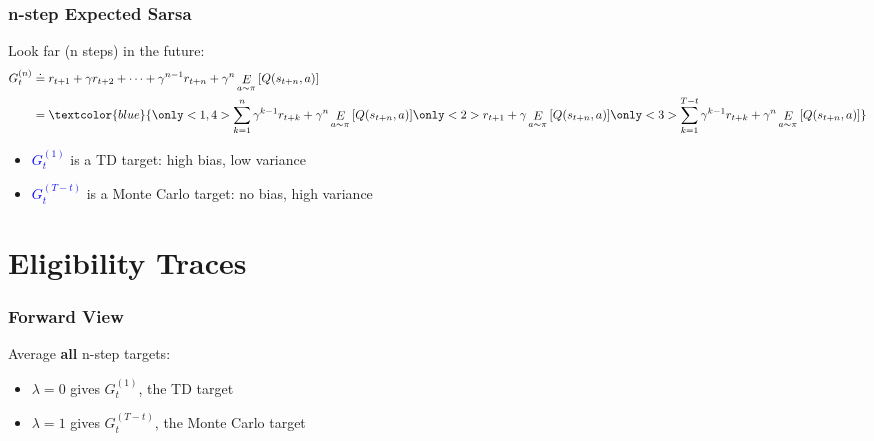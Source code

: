\documentclass{beamer}
\newcommand{\expect}[2]{\mathop{E}_{#1}\left[#2\right]}
\begin{document}
\begin{frame}
\frametitle{n-step Expected Sarsa}
Look far (n steps) in the future:
\begin{align*}
	G_t^{(n)} &\doteq r_{t+1} + \gamma r_{t+2} + \dots + \gamma^{n-1}r_{t+n}
		+ \gamma^n\expect{a\sim\pi}{Q(s_{t+n},a)} \\
		& = \textcolor{blue}{
		\only<1,4>{
		\sum_{k=1}^{n}\gamma^{k-1}r_{t+k} + \gamma^n\expect{a\sim\pi}{Q(s_{t+n},a)}
		}\only<2>{
		r_{t+1}+\gamma\expect{a\sim\pi}{Q(s_{t+n},a)}
		}\only<3>{
		\sum_{k=1}^{T-t}\gamma^{k-1}r_{t+k} + \gamma^n\expect{a\sim\pi}{Q(s_{t+n},a)}}
		}
\end{align*}
\begin{itemize}
\item<2,4> \textcolor{blue}{$G_t^{(1)}$} is a TD target: high bias, low variance
\item<3-> \textcolor{blue}{$G_t^{(T-t)}$} is a Monte Carlo target: no bias, high variance
\end{itemize}
\end{frame}



\section{Eligibility Traces}

\frame{\tableofcontents[currentsection]}

\begin{frame}
\frametitle{Forward View}
Average \textbf{all} n-step targets:
\begin{itemize}
\item<3,5> $\lambda=0$ gives $G_t^{(1)}$, the TD target
\item<4,5> $\lambda=1$ gives $G_t^{(T-t)}$, the Monte Carlo target
\end{itemize}
\end{frame}
\end{document}
